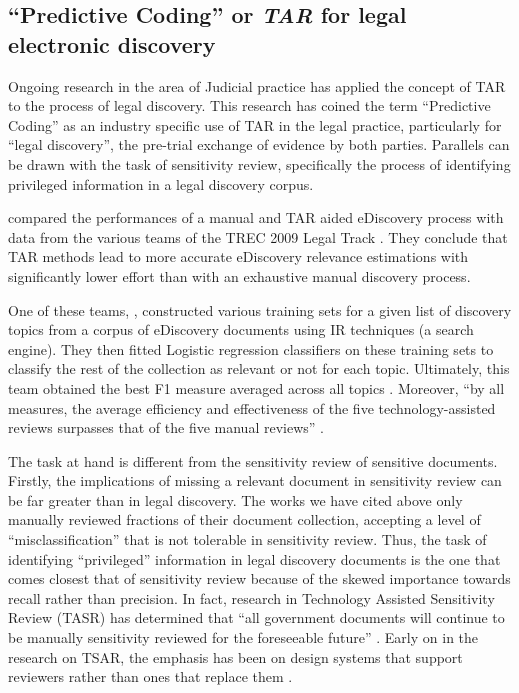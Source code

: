 \documentclass[\version]{l4proj}
\begin{document}
\subsection{``Predictive Coding'' or \textit{TAR} for legal electronic discovery}

Ongoing research in the area of Judicial practice has applied the concept of TAR to the process of legal discovery.
This research has coined the term ``Predictive Coding'' \autocite{carrollGrossmancormackGlossaryTechnologyassisted2013} as an industry specific use of TAR in the legal practice, particularly for ``legal discovery'', the pre-trial exchange of evidence by both parties.
Parallels can be drawn with the task of sensitivity review, specifically the process of identifying privileged information in a legal discovery corpus.

\textcite{grossmanTechnologyAssistedReviewEDiscovery2010} compared the performances of a manual and TAR aided eDiscovery process with data from the various teams of the TREC 2009 Legal Track \autocite{hedinOverviewTREC2009}.
They conclude that TAR methods lead to more accurate eDiscovery relevance estimations with significantly lower effort than with an exhaustive manual discovery process.

One of these teams, \textcite{cormackMachineLearningInformation2009}, constructed various training sets for a given list of discovery topics from a corpus of eDiscovery documents using IR techniques (a search engine).
They then fitted Logistic regression classifiers on these training sets to classify the rest of the collection as relevant or not for each topic.
Ultimately, this team obtained the best F1 measure averaged across all topics \autocite{hedinOverviewTREC2009}.
Moreover, ``by all measures, the average efficiency and effectiveness of the five technology-assisted reviews surpasses that of the five manual reviews'' \autocite[p.~43]{grossmanTechnologyAssistedReviewEDiscovery2010}.

The task at hand is different from the sensitivity review of sensitive documents.
Firstly, the implications of missing a relevant document in sensitivity review can be far greater than in legal discovery.
The works we have cited above only manually reviewed fractions of their document collection, accepting a level of ``misclassification'' that is not tolerable in sensitivity review.
Thus, the task of identifying ``privileged'' information in legal discovery documents is the one that comes closest that of sensitivity review \autocite{berardiSemiAutomatedTextClassification2015} because of the skewed importance towards recall rather than precision.
In fact, research in Technology Assisted Sensitivity Review (TASR) has determined that ``all government documents will continue to be manually sensitivity reviewed for the foreseeable future'' \autocite[1]{mcdonaldHowSensitivityClassification2019}.
Early on in the research on TSAR, the emphasis has been on design systems that support reviewers rather than ones that replace them \autocite{mcdonaldClassifierDigitalSensitivity2014}.
\end{document}
